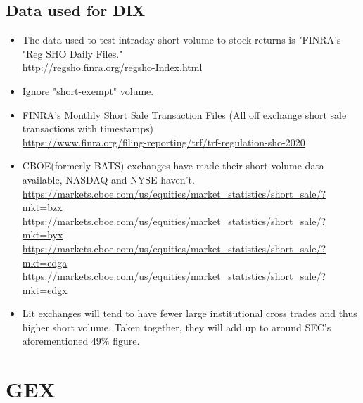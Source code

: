 \documentclass[12pt, oneside]{article}
\begin{document}
\subsection{Data used for DIX}
\begin{itemize}
    \item The data used to test intraday short volume to stock returns is "FINRA's "Reg SHO Daily Files."
    \\ \url{http://regsho.finra.org/regsho-Index.html}
    \item Ignore "short-exempt" volume.
    \item FINRA's Monthly Short Sale Transaction Files (All off exchange short sale transactions with timestamps)
    \\\url{https://www.finra.org/filing-reporting/trf/trf-regulation-sho-2020}
    \item CBOE(formerly BATS) exchanges have made their short volume data available, NASDAQ and NYSE haven't.
    \\\url{https://markets.cboe.com/us/equities/market_statistics/short_sale/?mkt=bzx}
    \\\url{https://markets.cboe.com/us/equities/market_statistics/short_sale/?mkt=byx}
    \\\url{https://markets.cboe.com/us/equities/market_statistics/short_sale/?mkt=edga}
    \\\url{https://markets.cboe.com/us/equities/market_statistics/short_sale/?mkt=edgx}
    \item Lit exchanges will tend to have fewer large institutional cross trades and thus higher short volume. Taken together, they will add up to around SEC's aforementioned 49\% figure.
    
\end{itemize}

\newpage

\section{GEX}
\end{document}
